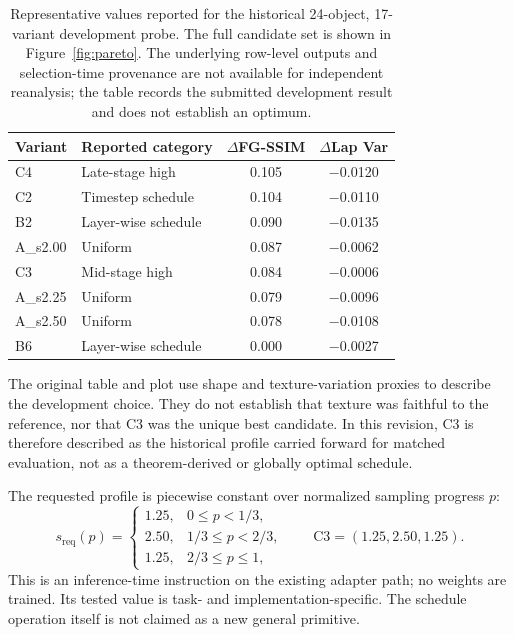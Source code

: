 \documentclass[times,twocolumn,final]{elsarticle}
\begin{document}
\begin{table}[t]
\centering
\caption{Representative values reported for the historical 24-object, 17-variant development probe. The full candidate set is shown in Figure~\ref{fig:pareto}. The underlying row-level outputs and selection-time provenance are not available for independent reanalysis; the table records the submitted development result and does not establish an optimum.}
\label{tab:probe}
\footnotesize\setlength{\tabcolsep}{3pt}
\begin{tabular}{llcc}
\toprule
Variant & Reported category & $\Delta$FG-SSIM & $\Delta$Lap Var \\
\midrule
C4 & Late-stage high & 0.105 & $-$0.0120 \\
C2 & Timestep schedule & 0.104 & $-$0.0110 \\
B2 & Layer-wise schedule & 0.090 & $-$0.0135 \\
A\_s2.00 & Uniform & 0.087 & $-$0.0062 \\
C3 & Mid-stage high & 0.084 & $-$0.0006 \\
A\_s2.25 & Uniform & 0.079 & $-$0.0096 \\
A\_s2.50 & Uniform & 0.078 & $-$0.0108 \\
B6 & Layer-wise schedule & 0.000 & $-$0.0027 \\
\bottomrule
\end{tabular}
\end{table}

The original table and plot use shape and texture-variation proxies to describe the development choice. They do not establish that texture was faithful to the reference, nor that C3 was the unique best candidate. In this revision, C3 is therefore described as the historical profile carried forward for matched evaluation, not as a theorem-derived or globally optimal schedule.

The requested profile is piecewise constant over normalized sampling progress $p$:
\begin{equation}
s_{\mathrm{req}}(p) =
\begin{cases}
1.25, & 0 \le p < 1/3,\\
2.50, & 1/3 \le p < 2/3,\\
1.25, & 2/3 \le p \le 1,
\end{cases}
\qquad \mathrm{C3}=(1.25,2.50,1.25).
\end{equation}
This is an inference-time instruction on the existing adapter path; no weights are trained. Its tested value is task- and implementation-specific. The schedule operation itself is not claimed as a new general primitive.
\end{document}
